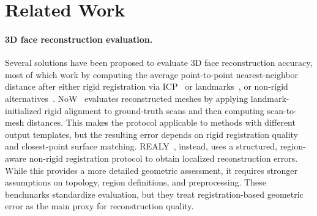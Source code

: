 \documentclass{article}
\begin{document}





\section{Related Work}
\label{sec:related_work}
\paragraph{3D face reconstruction evaluation.}
Several solutions have been proposed to evaluate 3D face reconstruction accuracy, most of which work by computing the average point-to-point nearest-neighbor distance after either rigid registration via ICP~\cite{jackson17,deng2019accurate,gecer2019ganfit,gecer2021fast,genova18,Bai_2021_CVPR, prnet, feng2018evaluation, sariyanidi20, shang20} or landmarks~\cite{liu2018disentangling,zhu2020beyond}, or non-rigid alternatives~\cite{ferrari2021sparse,booth20163d,gilani2017dense}.
NoW~\cite{now} evaluates reconstructed meshes by applying landmark-initialized rigid alignment to ground-truth scans and then computing scan-to-mesh distances. This makes the protocol applicable to methods with different output templates, but the resulting error depends on rigid registration quality and closest-point surface matching. 
REALY~\cite{REALY}, instead, uses a structured, region-aware non-rigid registration protocol to obtain localized reconstruction errors. While this provides a more detailed geometric assessment, it requires stronger assumptions on topology, region definitions, and preprocessing. These benchmarks standardize evaluation, but they treat registration-based geometric error as the main proxy for reconstruction quality.
\end{document}
